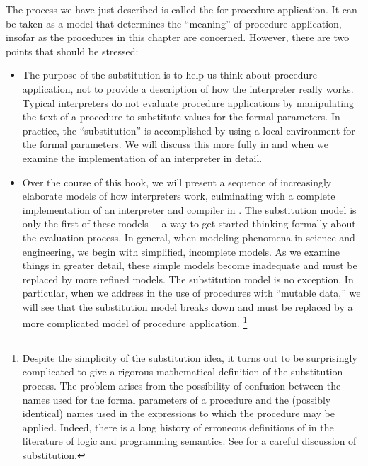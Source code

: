 The process we have just described is called the  for procedure application.
It can be taken as a model that determines the “meaning” of procedure application, insofar as the procedures in this chapter are concerned.
However, there are two points that should be stressed:
\begin{itemize}

	\item
	The purpose of the substitution is to help us think about procedure application, not to provide a description of how the interpreter really works.
	Typical interpreters do not evaluate procedure applications by manipulating the
	text of a procedure to substitute values for the formal parameters.
	In practice, the “substitution” is accomplished by using a local environment for the formal parameters.
	We will discuss this more fully in  and  when we examine the implementation of an interpreter in detail.

	\item
	Over the course of this book, we will present a sequence of increasingly elaborate models of how interpreters work, culminating with a complete implementation of an interpreter and compiler in .
	The substitution model is only the first of these models---%
	a way to get started thinking formally about the evaluation process.
	In general, when modeling phenomena in science and engineering, we begin with simplified, incomplete models.
	As we examine things in greater detail, these simple models become inadequate and must be replaced by more refined models.
	The substitution model is no exception.
	In particular, when we address in  the use of procedures with “mutable data,” we will see that the substitution model breaks down and must be replaced by a more complicated model of procedure application.%
	\footnote{
		Despite the simplicity of the substitution idea, it turns out to be surprisingly complicated to give a rigorous mathematical definition of the substitution process.
		The problem arises from the possibility of confusion between the names used for the formal parameters of a procedure and the (possibly identical) names used in the expressions to which the procedure may be applied.
		Indeed, there is a long history of erroneous definitions of  in the literature of logic and programming semantics.
		See  for a careful discussion of substitution.
	}

\end{itemize}



